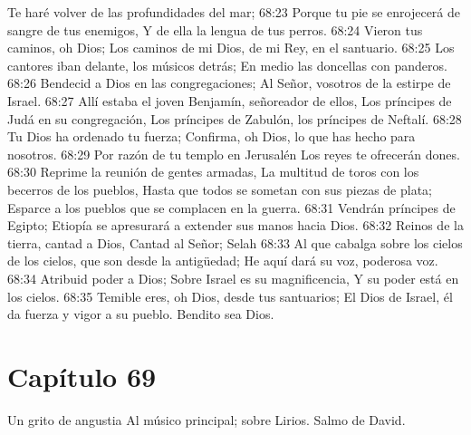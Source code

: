 Te haré volver de las profundidades del mar; 
68:23 Porque tu pie se enrojecerá de sangre de tus enemigos, 
Y de ella la lengua de tus perros. 
68:24 Vieron tus caminos, oh Dios; 
Los caminos de mi Dios, de mi Rey, en el santuario. 
68:25 Los cantores iban delante, los músicos detrás; 
En medio las doncellas con panderos. 
68:26 Bendecid a Dios en las congregaciones; 
Al Señor, vosotros de la estirpe de Israel. 
68:27 Allí estaba el joven Benjamín, señoreador de ellos, 
Los príncipes de Judá en su congregación, 
Los príncipes de Zabulón, los príncipes de Neftalí. 
68:28 Tu Dios ha ordenado tu fuerza; 
Confirma, oh Dios, lo que has hecho para nosotros. 
68:29 Por razón de tu templo en Jerusalén 
Los reyes te ofrecerán dones. 
68:30 Reprime la reunión de gentes armadas, 
La multitud de toros con los becerros de los pueblos, 
Hasta que todos se sometan con sus piezas de plata; 
Esparce a los pueblos que se complacen en la guerra. 
68:31 Vendrán príncipes de Egipto; 
Etiopía se apresurará a extender sus manos hacia Dios. 
68:32 Reinos de la tierra, cantad a Dios, 
Cantad al Señor; Selah 
68:33 Al que cabalga sobre los cielos de los cielos, que son desde la antigüedad; 
He aquí dará su voz, poderosa voz. 
68:34 Atribuid poder a Dios; 
Sobre Israel es su magnificencia, 
Y su poder está en los cielos. 
68:35 Temible eres, oh Dios, desde tus santuarios; 
El Dios de Israel, él da fuerza y vigor a su pueblo. 
Bendito sea Dios. 
\section*{Capítulo 69}
Un grito de angustia 
Al músico principal; sobre Lirios. Salmo de David. 
 
